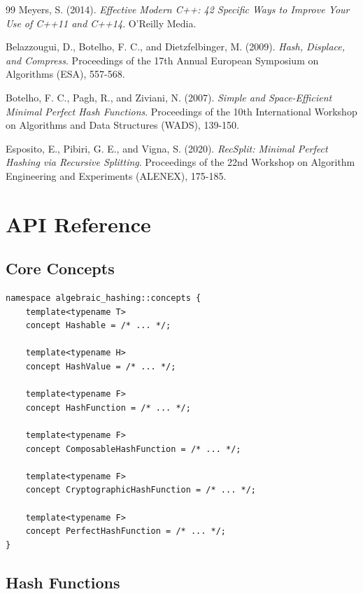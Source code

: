 \documentclass[11pt,a4paper]{article}
\theoremstyle{definition}
\begin{document}
\begin{thebibliography}{99}
Meyers, S. (2014).
\textit{Effective Modern C++: 42 Specific Ways to Improve Your Use of C++11 and C++14}.
O'Reilly Media.

Belazzougui, D., Botelho, F. C., and Dietzfelbinger, M. (2009).
\textit{Hash, Displace, and Compress}.
Proceedings of the 17th Annual European Symposium on Algorithms (ESA), 557-568.

Botelho, F. C., Pagh, R., and Ziviani, N. (2007).
\textit{Simple and Space-Efficient Minimal Perfect Hash Functions}.
Proceedings of the 10th International Workshop on Algorithms and Data Structures (WADS), 139-150.

Esposito, E., Pibiri, G. E., and Vigna, S. (2020).
\textit{RecSplit: Minimal Perfect Hashing via Recursive Splitting}.
Proceedings of the 22nd Workshop on Algorithm Engineering and Experiments (ALENEX), 175-185.

\end{thebibliography}

\appendix

\section{API Reference}

\subsection{Core Concepts}

\begin{lstlisting}[caption={Complete concept hierarchy}]
namespace algebraic_hashing::concepts {
    template<typename T>
    concept Hashable = /* ... */;

    template<typename H>
    concept HashValue = /* ... */;

    template<typename F>
    concept HashFunction = /* ... */;

    template<typename F>
    concept ComposableHashFunction = /* ... */;

    template<typename F>
    concept CryptographicHashFunction = /* ... */;

    template<typename F>
    concept PerfectHashFunction = /* ... */;
}
\end{lstlisting}

\subsection{Hash Functions}
\end{document}
